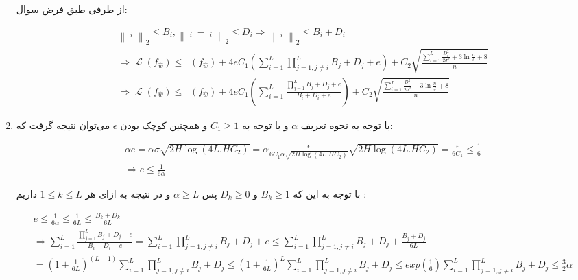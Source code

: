 \documentclass{article}
\DeclareMathOperator{\Wp}{\hat{W}^{(0)}}
\DeclareMathOperator{\Wh}{\hat{W}}
\DeclareMathOperator{\Lossh}{\hat{\mathcal{L}}}
\DeclareMathOperator{\Loss}{\mathcal{L}}
\begin{document}
\begin{enumerate}
از طرفی طبق فرض سوال:

\begin{subequations}
\begin{alignat}{2}
    \left\lVert {\Wp}_i \right\rVert_2 \leq B_i , \left\lVert {\Wh}_i - {\Wp}_i \right\rVert_2 \leq D_i 
    \Rightarrow
    \left\lVert {\Wh}_i \right\rVert_2 \leq B_i + D_i \\
    \Rightarrow
    \Loss(f_{\hat{w}}) \leq \Lossh(f_{\hat{w}}) + 
    4e C_1 (\sum_{i=1}^L
    \prod_{j=1, j\neq i}^{L} B_j + D_j + e
    )  +  C_2 \sqrt{\frac
    {\sum_{i=1}^L \frac{D_i^2}{2\sigma^2} + 3 \ln {\frac{n}{\delta}} + 8}
    {n}}\\ \label{eq:final}
    \Rightarrow
    \Loss(f_{\hat{w}}) \leq \Lossh(f_{\hat{w}}) + 
    4e C_1 (\sum_{i=1}^L
    \frac
    {\prod_{j=1}^{L} B_j + D_j + e}
    {B_i + D_i + e}
    )  +  C_2 \sqrt{\frac
    {\sum_{i=1}^L \frac{D_i^2}{2\sigma^2} + 3 \ln {\frac{n}{\delta}} + 8}
    {n}}
\end{alignat}
\end{subequations}

\item
با توجه به نحوه تعریف 
$\alpha$
و با توجه به 
$C_1 \geq 1$
و همچنین کوچک بودن 
$\epsilon$
می‌توان نتیجه گرفت که:

\begin{subequations}
\begin{alignat}{2}
    \alpha e = \alpha \sigma \sqrt{2H \log (4L.HC_2)} = \alpha 
    \frac{\epsilon}{6C_1 \alpha \sqrt{2H \log (4L.HC_2)}}
    \sqrt{2H \log (4L.HC_2)} = \frac{\epsilon}{6C_1} \leq \frac{1}{6}\\
    \Rightarrow e \leq \frac{1}{6\alpha}
\end{alignat}
\end{subequations}

با توجه به این که 
$B_k \geq 1$ 
و
$D_k \geq 0$
پس 
$\alpha \geq L$
و در نتیجه به ازای هر 
$1\leq k \leq L$
داریم
:

\begin{subequations}
\begin{alignat}{2}
e \leq \frac{1}{6\alpha} \leq \frac{1}{6L} \leq \frac{B_k + D_k}{6L} \\
\Rightarrow \sum_{i=1}^L
    \frac
    {\prod_{j=1}^{L} B_j + D_j + e}
    {B_i + D_i + e}
     = \sum_{i=1}^L
    \prod_{j=1, j\neq i}^{L} B_j + D_j + e \leq \sum_{i=1}^L
    \prod_{j=1, j\neq i}^{L} B_j + D_j + \frac{B_j+D_j}{6L} \\ = (1+\frac{1}{6L})^{(L-1)} \sum_{i=1}^L
    \prod_{j=1, j\neq i}^{L} B_j + D_j \leq  (1+\frac{1}{6L})^{L} \sum_{i=1}^L
    \prod_{j=1, j\neq i}^{L} B_j + D_j \leq
    exp(\frac{1}{6}) \sum_{i=1}^L
    \prod_{j=1, j\neq i}^{L} B_j + D_j \leq \frac{3}{2} \alpha
\end{alignat}
\end{subequations}


\end{enumerate}
\end{document}
